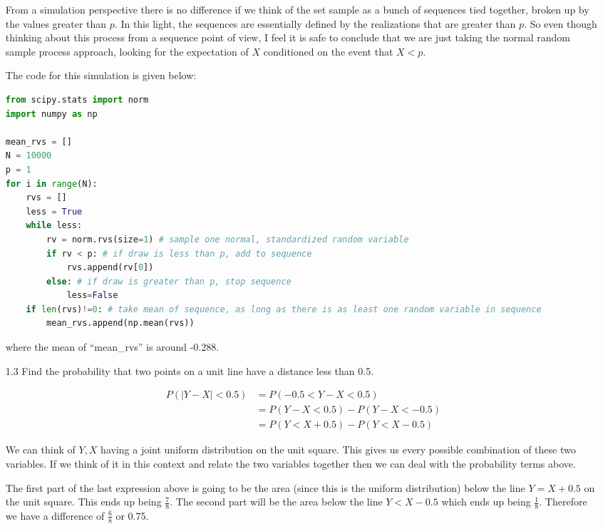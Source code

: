 \begin{enumerate}
From a simulation perspective there is no difference if we think of the set sample as a bunch of sequences tied together, broken up by the values greater than $p$. In this light, the sequences are essentially defined by the realizations that are greater than $p$. So even though thinking about this process from a sequence point of view, I feel it is safe to conclude that we are just taking the normal random sample process approach, looking for the expectation of $X$ conditioned on the event that $X<p$. 

The code for this simulation is given below:

\begin{lstlisting}[language=Python]
from scipy.stats import norm
import numpy as np

mean_rvs = []
N = 10000
p = 1
for i in range(N):
    rvs = []
    less = True
    while less:
        rv = norm.rvs(size=1) # sample one normal, standardized random variable
        if rv < p: # if draw is less than p, add to sequence
            rvs.append(rv[0])
        else: # if draw is greater than p, stop sequence
            less=False
    if len(rvs)!=0: # take mean of sequence, as long as there is as least one random variable in sequence
        mean_rvs.append(np.mean(rvs))
\end{lstlisting}
\noindent where the mean of ``mean\_rvs'' is around -0.288.


\item[1.3] Find the probability that two points on a unit line have a distance less than 0.5. 

\begin{equation}
\begin{split}
P(|Y-X| < 0.5) &= P(-0.5 < Y-X < 0.5) \\
&= P(Y-X < 0.5) - P(Y-X < -0.5) \\
&= P(Y < X + 0.5) - P(Y < X - 0.5)
\end{split}
\end{equation}

We can think of $Y, X$ having a joint uniform distribution on the unit square. This gives us every possible combination of these two variables. If we think of it in this context and relate the two variables together then we can deal with the probability terms above. 

The first part of the last expression above is going to be the area (since this is the uniform distribution) below the line $Y = X + 0.5$ on the unit square. This ends up being $\frac{7}{8}$. The second part will be the area below the line $Y < X - 0.5$ which ends up being $\frac{1}{8}$. Therefore we have a difference of $\frac{6}{8}$ or 0.75. 

\end{enumerate}